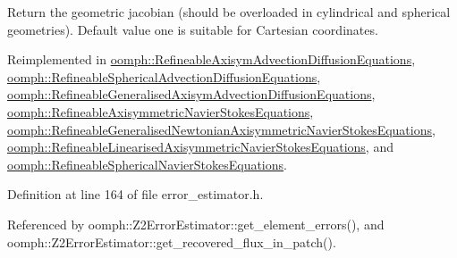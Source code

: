 Return the geometric jacobian (should be overloaded in cylindrical and spherical geometries). Default value one is suitable for Cartesian coordinates. 



Reimplemented in \hyperlink{classoomph_1_1RefineableAxisymAdvectionDiffusionEquations_a5a2a06eb5a41ce5a06327d0637b60183}{oomph\+::\+Refineable\+Axisym\+Advection\+Diffusion\+Equations}, \hyperlink{classoomph_1_1RefineableSphericalAdvectionDiffusionEquations_addfcf580759ab8cf263c8e00acd31953}{oomph\+::\+Refineable\+Spherical\+Advection\+Diffusion\+Equations}, \hyperlink{classoomph_1_1RefineableGeneralisedAxisymAdvectionDiffusionEquations_a56cf6ea0f73a5a3fb80e44d56c31f852}{oomph\+::\+Refineable\+Generalised\+Axisym\+Advection\+Diffusion\+Equations}, \hyperlink{classoomph_1_1RefineableAxisymmetricNavierStokesEquations_a2821817758a676f37d3bfe4629620b71}{oomph\+::\+Refineable\+Axisymmetric\+Navier\+Stokes\+Equations}, \hyperlink{classoomph_1_1RefineableGeneralisedNewtonianAxisymmetricNavierStokesEquations_a1079d819a74edb3a620dc01061168950}{oomph\+::\+Refineable\+Generalised\+Newtonian\+Axisymmetric\+Navier\+Stokes\+Equations}, \hyperlink{classoomph_1_1RefineableLinearisedAxisymmetricNavierStokesEquations_a6ac5e611a2b85e304329374a0a35cee0}{oomph\+::\+Refineable\+Linearised\+Axisymmetric\+Navier\+Stokes\+Equations}, and \hyperlink{classoomph_1_1RefineableSphericalNavierStokesEquations_a2705f68643cc0fc85bc31f8b26189b6d}{oomph\+::\+Refineable\+Spherical\+Navier\+Stokes\+Equations}.



Definition at line 164 of file error\+\_\+estimator.\+h.



Referenced by oomph\+::\+Z2\+Error\+Estimator\+::get\+\_\+element\+\_\+errors(), and oomph\+::\+Z2\+Error\+Estimator\+::get\+\_\+recovered\+\_\+flux\+\_\+in\+\_\+patch().

\mbox{\label{classoomph_1_1ElementWithZ2ErrorEstimator_a2d894f4d55c63e77bd9f3420ccf9d315}} 
